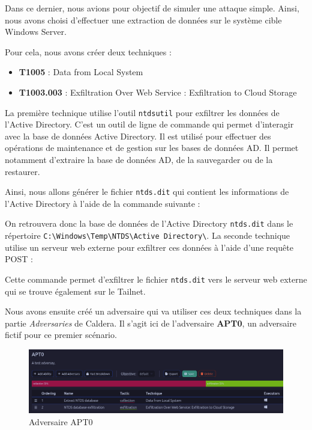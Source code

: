 \documentclass[12pt,letterpaper]{article}
\begin{document}
Dans ce dernier, nous avions pour objectif de simuler une attaque simple.
Ainsi, nous avons choisi d'effectuer une extraction de données sur le système cible Windows Server.

Pour cela, nous avons créer deux techniques :
\begin{itemize}
    \item \textbf{T1005} : Data from Local System
    \item \textbf{T1003.003} : Exfiltration Over Web Service : Exfiltration to Cloud Storage
\end{itemize}

La première technique utilise l'outil \verb|ntdsutil| pour exfiltrer les données de l'Active Directory.
C'est un outil de ligne de commande qui permet d'interagir avec la base de données Active Directory.
Il est utilisé pour effectuer des opérations de maintenance et de gestion sur les bases de données AD.
Il permet notamment d'extraire la base de données AD, de la sauvegarder ou de la restaurer.

Ainsi, nous allons générer le fichier \verb|ntds.dit| qui contient les informations de l'Active Directory à l'aide de la commande suivante :


On retrouvera donc la base de données de l'Active Directory \verb|ntds.dit| dans le répertoire \verb|C:\Windows\Temp\NTDS\Active Directory\|.
La seconde technique utilise un serveur web externe pour exfiltrer ces données à l'aide d'une requête POST :

Cette commande permet d'exfiltrer le fichier \verb|ntds.dit| vers le serveur web externe qui se trouve également sur le Tailnet.

\bigskip

Nous avons ensuite créé un adversaire qui va utiliser ces deux techniques dans la partie \textit{Adversaries} de Caldera.
Il s'agit ici de l'adversaire \textbf{APT0}, un adversaire fictif pour ce premier scénario.

\begin{figure}[h!]
    \centering
    \includegraphics[width=1\textwidth]{images/caldera/apt0_adversary.png}
    \caption{Adversaire APT0}
    \label{fig:apt0_adversary}
\end{figure}
\end{document}
